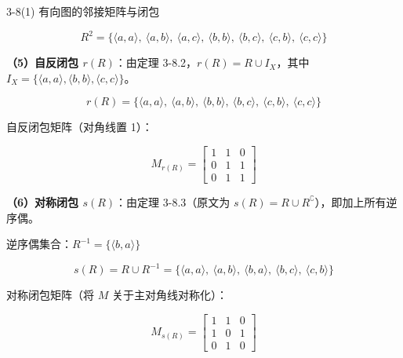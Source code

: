 \documentclass[11pt]{article}
\begin{document}
\begin{question}{3-8(1) 有向图的邻接矩阵与闭包}
\begin{answer}
    $$R^2 = \{\langle a,a\rangle,\ \langle a,b\rangle,\ \langle a,c\rangle,\ \langle b,b\rangle,\ \langle b,c\rangle,\ \langle c,b\rangle,\ \langle c,c\rangle\}$$

    \vspace{0.5em}
    \textbf{（5）自反闭包 $r(R)$}：由定理 3-8.2，$r(R) = R \cup I_X$，其中 $I_X = \{\langle a,a\rangle, \langle b,b\rangle, \langle c,c\rangle\}$。

    $$r(R) = \{\langle a,a\rangle,\ \langle a,b\rangle,\ \langle b,b\rangle,\ \langle b,c\rangle,\ \langle c,b\rangle,\ \langle c,c\rangle\}$$

    自反闭包矩阵（对角线置 1）：

    $$M_{r(R)} = \begin{bmatrix} 1 & 1 & 0 \\ 0 & 1 & 1 \\ 0 & 1 & 1 \end{bmatrix}$$

    \vspace{0.5em}
    \textbf{（6）对称闭包 $s(R)$}：由定理 3-8.3（原文为 $s(R) = R \cup R^\complement$），即加上所有逆序偶。

    逆序偶集合：$R^{-1} = \{\langle b,a\rangle\}$

    $$s(R) = R \cup R^{-1} = \{\langle a,a\rangle,\ \langle a,b\rangle,\ \langle b,a\rangle,\ \langle b,c\rangle,\ \langle c,b\rangle\}$$

    对称闭包矩阵（将 $M$ 关于主对角线对称化）：

    $$M_{s(R)} = \begin{bmatrix} 1 & 1 & 0 \\ 1 & 0 & 1 \\ 0 & 1 & 0 \end{bmatrix}$$
  \end{answer}
\end{question}

\end{document}

